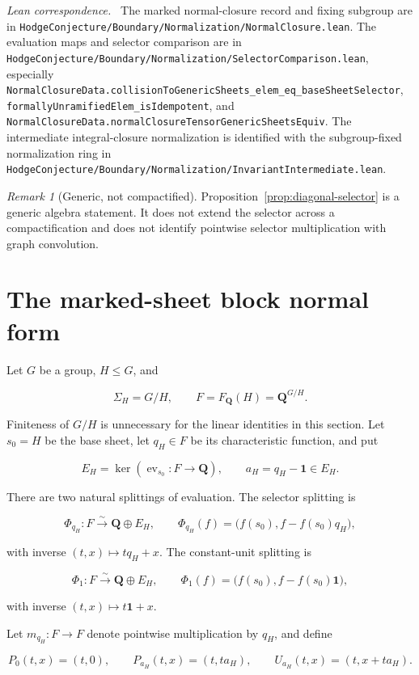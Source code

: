 \documentclass[11pt]{article}
\theoremstyle{definition}
\theoremstyle{remark}
\newtheorem*{remark}{Remark}
\DeclareMathOperator{\ev}{ev}
\newcommand{\Q}{\mathbf Q}
\newcommand{\one}{\mathbf 1}
\newcommand{\leanpath}[1]{\texttt{\nolinkurl{#1}}}
\newcommand{\normsrc}[1]{%
  \leanpath{HodgeConjecture/Boundary/Normalization/#1}}
\newenvironment{leanfiles}
  {\par\medskip\begingroup\footnotesize\raggedright\noindent
   \textit{Lean correspondence.}\ }
  {\par\endgroup\medskip}
\begin{document}
\begin{leanfiles}
The marked normal-closure record and fixing subgroup are in
\normsrc{NormalClosure.lean}.  The evaluation maps and selector comparison
are in \normsrc{SelectorComparison.lean}, especially
\leanpath{NormalClosureData.collisionToGenericSheets_elem_eq_baseSheetSelector},
\leanpath{formallyUnramifiedElem_isIdempotent}, and
\leanpath{NormalClosureData.normalClosureTensorGenericSheetsEquiv}.
The intermediate integral-closure normalization is identified with the
subgroup-fixed normalization ring in
\normsrc{InvariantIntermediate.lean}.
\end{leanfiles}

\begin{remark}[Generic, not compactified]
Proposition~\ref{prop:diagonal-selector} is a generic algebra statement.  It
does not extend the selector across a compactification and does not identify
pointwise selector multiplication with graph convolution.
\end{remark}

\section{The marked-sheet block normal form}
\label{sec:marked-block}

Let \(G\) be a group, \(H\leq G\), and

\[
  \Sigma_H=G/H,
  \qquad F=F_{\Q}(H)=\Q^{G/H}.
\]

Finiteness of \(G/H\) is unnecessary for the linear identities in this
section.  Let \(s_0=H\) be the base sheet, let \(q_H\in F\) be its
characteristic function, and put

\[
  E_H=\ker(\ev_{s_0}:F\to\Q),
  \qquad
  a_H=q_H-\one\in E_H.
\]

There are two natural splittings of evaluation.  The selector splitting is

\[
  \Phi_{q_H}:F\xrightarrow{\sim}\Q\oplus E_H,
  \qquad
  \Phi_{q_H}(f)=
    \bigl(f(s_0),f-f(s_0)q_H\bigr),
\]

with inverse \((t,x)\mapsto tq_H+x\).  The constant-unit splitting is

\[
  \Phi_1:F\xrightarrow{\sim}\Q\oplus E_H,
  \qquad
  \Phi_1(f)=
    \bigl(f(s_0),f-f(s_0)\one\bigr),
\]

with inverse \((t,x)\mapsto t\one+x\).

Let \(m_{q_H}:F\to F\) denote pointwise multiplication by \(q_H\), and define

\[
  P_0(t,x)=(t,0),
  \qquad
  P_{a_H}(t,x)=(t,ta_H),
  \qquad
  U_{a_H}(t,x)=(t,x+ta_H).
\]
\end{document}

